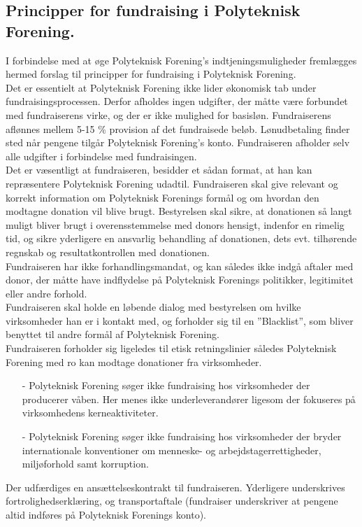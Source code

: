 \subsection{Principper for fundraising i Polyteknisk Forening.}
I forbindelse med at øge Polyteknisk Forening’s indtjeningsmuligheder fremlægges hermed forslag til principper for fundraising i Polyteknisk Forening.\\

Det er essentielt at Polyteknisk Forening ikke lider økonomisk tab under fundraisingsprocessen. Derfor afholdes ingen udgifter, der måtte være forbundet med fundraiserens virke, og der er ikke mulighed for basisløn. Fundraiserens aflønnes mellem 5-15 \% provision af det fundraisede beløb. Lønudbetaling finder sted når pengene tilgår Polyteknisk Forening’s konto. Fundraiseren afholder selv alle udgifter i forbindelse med fundraisingen.\\

Det er væsentligt at fundraiseren, besidder et sådan format, at han kan repræsentere Polyteknisk Forening udadtil. Fundraiseren skal give relevant og korrekt information om Polyteknisk Forenings formål og om hvordan den modtagne donation vil blive brugt. Bestyrelsen skal sikre, at donationen så langt muligt bliver brugt i overensstemmelse med donors hensigt, indenfor en rimelig tid, og sikre yderligere en ansvarlig behandling af donationen, dets evt. tilhørende regnskab og resultatkontrollen med donationen.\\

Fundraiseren har ikke forhandlingsmandat, og kan således ikke indgå aftaler med donor, der måtte have indflydelse på Polyteknisk Forenings politikker, legitimitet eller andre forhold.\\

Fundraiseren skal holde en løbende dialog med bestyrelsen om hvilke virksomheder han er i kontakt med, og forholder sig til en ”Blacklist”, som bliver benyttet til andre formål af Polyteknisk Forening.\\

Fundraiseren forholder sig ligeledes til etisk retningslinier således Polyteknisk Forening med ro kan modtage donationer fra virksomheder.
\begin{itemize}
\item[-] Polyteknisk Forening søger ikke fundraising hos virksomheder der producerer våben. Her menes ikke
underleverandører ligesom der fokuseres på virksomhedens kerneaktiviteter.
\item[-] Polyteknisk Forening søger ikke fundraising hos virksomheder der bryder internationale konventioner om
menneske- og arbejdstagerrettigheder, miljøforhold samt korruption.
\end{itemize}

Der udfærdiges en ansættelseskontrakt til fundraiseren. Yderligere underskrives fortrolighedserklæring, og transportaftale (fundraiser underskriver at pengene altid indføres på Polyteknisk Forenings konto).